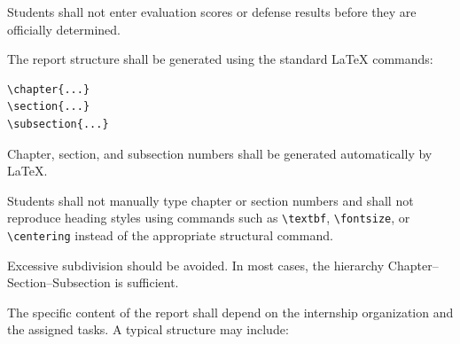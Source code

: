 {Students shall not enter evaluation scores or defense results before they
are officially determined.

\vspace{0.3cm}


\noindent
{}

\vspace{0.15cm}

The report structure shall be generated using the standard \LaTeX{}
commands:

\begin{verbatim}
\chapter{...}
\section{...}
\subsection{...}
\end{verbatim}

Chapter, section, and subsection numbers shall be generated automatically
by \LaTeX{}.

Students shall not manually type chapter or section numbers and shall not
reproduce heading styles using commands such as \verb|\textbf|,
\verb|\fontsize|, or \verb|\centering| instead of the appropriate
structural command.

Excessive subdivision should be avoided. In most cases, the hierarchy
Chapter--Section--Subsection is sufficient.

\vspace{0.3cm}


\noindent
{}

\vspace{0.15cm}

The specific content of the report shall depend on the internship
organization and the assigned tasks. A typical structure may include:

}
